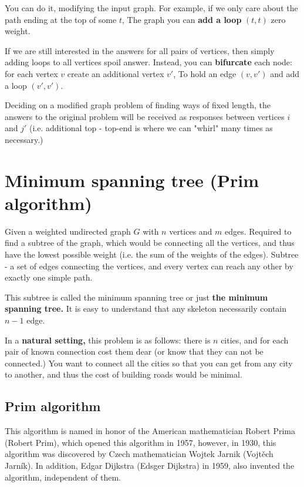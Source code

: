 You can do it, modifying the input graph. For example, if we only care about the path ending at the top of some $t$, The graph you can \textbf{add a loop} $(t, t)$ zero weight.

If we are still interested in the answers for all pairs of vertices, then simply adding loops to all vertices spoil answer. Instead, you can \textbf{bifurcate} each node: for each vertex $v$ create an additional vertex $v '$, To hold an edge $(v, v ')$ and add a loop $(v ', v')$.

Deciding on a modified graph problem of finding ways of fixed length, the answers to the original problem will be received as responses between vertices $i$ and $j '$ (i.e. additional top - top-end is where we can "whirl" many times as necessary.)

\section{ Minimum spanning tree (Prim algorithm) }
Given a weighted undirected graph $G$ with $n$ vertices and $m$ edges. Required to find a subtree of the graph, which would be connecting all the vertices, and thus have the lowest possible weight (i.e. the sum of the weights of the edges). Subtree - a set of edges connecting the vertices, and every vertex can reach any other by exactly one simple path.

This subtree is called the minimum spanning tree or just \textbf{the minimum spanning tree.} It is easy to understand that any skeleton necessarily contain $n-1$ edge.

In a \textbf{natural setting,} this problem is as follows: there is $n$ cities, and for each pair of known connection cost them dear (or know that they can not be connected.) You want to connect all the cities so that you can get from any city to another, and thus the cost of building roads would be minimal.

\subsection{ Prim algorithm }

This algorithm is named in honor of the American mathematician Robert Prima (Robert Prim), which opened this algorithm in 1957, however, in 1930, this algorithm was discovered by Czech mathematician Wojtek Jarnik (Vojtěch Jarník). In addition, Edgar Dijkstra (Edsger Dijkstra) in 1959, also invented the algorithm, independent of them.

